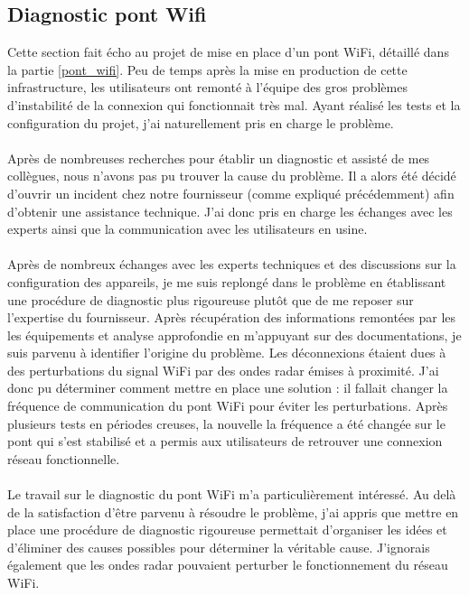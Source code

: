 \documentclass[a4paper,12pt]{report}
\begin{document}
\subsection{Diagnostic pont Wifi}
Cette section fait écho au projet de mise en place d'un pont WiFi, détaillé dans la partie \ref{pont_wifi}. Peu de temps après la mise en production de cette infrastructure, les utilisateurs ont remonté à l'équipe des gros problèmes d'instabilité de la connexion qui fonctionnait très mal. Ayant réalisé les tests et la configuration du projet, j'ai naturellement pris en charge le problème.
\paragraph{}
Après de nombreuses recherches pour établir un diagnostic et assisté de mes collègues, nous n'avons pas pu trouver la cause du problème. Il a alors été décidé d'ouvrir un incident chez notre fournisseur (comme expliqué précédemment) afin d'obtenir une assistance technique. J'ai donc pris en charge les échanges avec les experts ainsi que la communication avec les utilisateurs en usine.
\paragraph{}
Après de nombreux échanges avec les experts techniques et des discussions sur la configuration des appareils, je me suis replongé dans le problème en établissant une procédure de diagnostic plus rigoureuse plutôt que de me reposer sur l'expertise du fournisseur. Après récupération des informations remontées par les les équipements et analyse approfondie en m'appuyant sur des documentations, je suis parvenu à identifier l'origine du problème. Les déconnexions étaient dues à des perturbations du signal WiFi par des ondes radar émises à proximité. J'ai donc pu déterminer comment mettre en place une solution : il fallait changer la fréquence de communication du pont WiFi pour éviter les perturbations. Après plusieurs tests en périodes creuses, la nouvelle la fréquence a été changée sur le pont qui s'est stabilisé et a permis aux utilisateurs de retrouver une connexion réseau fonctionnelle.
\paragraph{}
Le travail sur le diagnostic du pont WiFi m'a particulièrement intéressé. Au delà de la satisfaction d'être parvenu à résoudre le problème, j'ai appris que mettre en place une procédure de diagnostic rigoureuse permettait d'organiser les idées et d'éliminer des causes possibles pour déterminer la véritable cause. J'ignorais également que les ondes radar pouvaient perturber le fonctionnement du réseau WiFi.
\end{document}
